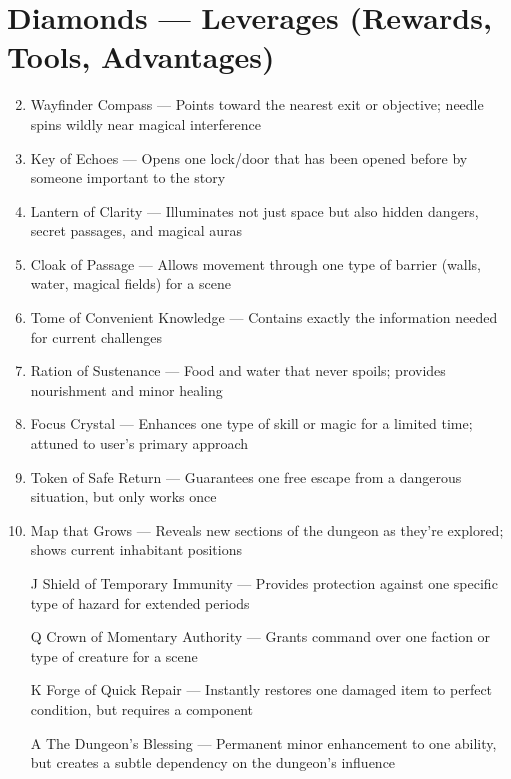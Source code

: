 \section*{Diamonds --- Leverages (Rewards, Tools, Advantages)}
\begin{enumerate}
\setcounter{enumi}{1}
\item Wayfinder Compass --- Points toward the nearest exit or objective; needle spins wildly near magical interference
\item Key of Echoes --- Opens one lock/door that has been opened before by someone important to the story
\item Lantern of Clarity --- Illuminates not just space but also hidden dangers, secret passages, and magical auras
\item Cloak of Passage --- Allows movement through one type of barrier (walls, water, magical fields) for a scene
\item Tome of Convenient Knowledge --- Contains exactly the information needed for current challenges
\item Ration of Sustenance --- Food and water that never spoils; provides nourishment and minor healing
\item Focus Crystal --- Enhances one type of skill or magic for a limited time; attuned to user's primary approach
\item Token of Safe Return --- Guarantees one free escape from a dangerous situation, but only works once
\item Map that Grows --- Reveals new sections of the dungeon as they're explored; shows current inhabitant positions
\item[J] Shield of Temporary Immunity --- Provides protection against one specific type of hazard for extended periods
\item[Q] Crown of Momentary Authority --- Grants command over one faction or type of creature for a scene
\item[K] Forge of Quick Repair --- Instantly restores one damaged item to perfect condition, but requires a component
\item[A] The Dungeon's Blessing --- Permanent minor enhancement to one ability, but creates a subtle dependency on the dungeon's influence
\end{enumerate}
